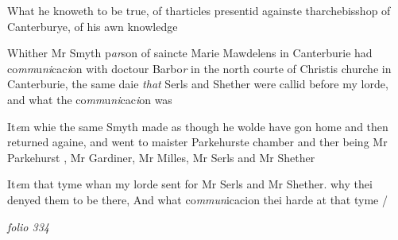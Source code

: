 \documentclass[12pt, a4paper]{book}
\begin{document}
            		
				\marginpar[\vspace{0.5cm}{\textcolor{Gray}{9}}]{}
			 
		\ifthenelse{\isodd{\thepage}}
		{\reversemarginpar}
		{\normalmarginpar}
		What he knoweth to be true, of tharticles presentid againste
tharchebisshop of Canterburye, of his awn knowledge

            		
				\marginpar[\vspace{0.5cm}{\textcolor{Gray}{10}}]{}
			 
		\ifthenelse{\isodd{\thepage}}
		{\reversemarginpar}
		{\normalmarginpar}
		Whither Mr Smyth p\textit{ar}son of saincte Marie Mawdelens in 
Canterburie had co\textit{mm}u\textit{ni}cac\textit{i}on with doctour Barbo\textit{r} in the north
courte of Christis churche in Canterburie, the same daie \textit{that} 
Serls and Shether were callid before my lorde, and what 
the co\textit{mm}u\textit{ni}cac\textit{i}on was

            		
				\marginpar[\vspace{0.5cm}{\textcolor{Gray}{11}}]{}
			 
		\ifthenelse{\isodd{\thepage}}
		{\reversemarginpar}
		{\normalmarginpar}
		It\textit{e}m whie the same Smyth made as though he wolde have
gon home and then returned againe, and went to maister
Parkehurste chamber and ther being Mr Parkehurst
			, Mr Gardiner, Mr Milles, Mr Serls and
Mr Shether

            		
				\marginpar[\vspace{0.5cm}{\textcolor{Gray}{12}}]{}
			 
		\ifthenelse{\isodd{\thepage}}
		{\reversemarginpar}
		{\normalmarginpar}
		It\textit{e}m that tyme whan my lorde sent for Mr Serls and 
Mr Shether. why thei denyed them to be there, And what 
co\textit{mmun}icacion thei harde at that tyme /

\dotfill
						\newpage
{}

\textit{folio 334}


         \vspace*{4cm}
         
\dotfill
						  \section*{}  \subsection*{}
\end{document}
